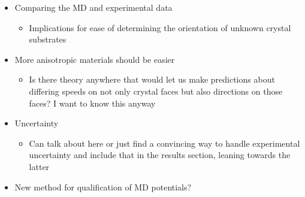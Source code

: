 
\begin{itemize}
\item Comparing the MD and experimental data
\begin{itemize}
\item Implications for ease of determining the orientation of unknown crystal substrates
\end{itemize}
\item More anisotropic materials should be easier
\begin{itemize}
\item Is there theory anywhere that would let us make predictions about differing speeds on not only crystal faces but also directions on those faces? I want to know this anyway
\end{itemize}
\item Uncertainty
\begin{itemize}
\item Can talk about here or just find a convincing way to handle experimental uncertainty and include that in the results section, leaning towards the latter
\end{itemize}
\item New method for qualification of MD potentials?
\end{itemize}